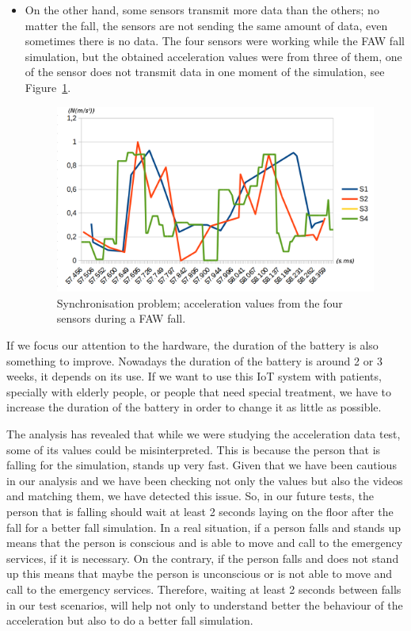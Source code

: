 \documentclass[review]{elsarticle}
\begin{document}
\begin{itemize}
 \item On the other hand, some sensors transmit more data than the others; no matter the fall, the sensors are not 
 sending the same amount of data, even sometimes there is no data. The four sensors were working while the FAW fall
 simulation, but the obtained acceleration values were from three of them, one of the sensor does not transmit data 
 in one moment of the simulation, see Figure~\ref{fig:synchronisation2}.
 
 \begin{figure}[!ht]
  \centering
  \includegraphics[scale=0.22]{img/synchronisation2.png}
  \caption[Comparison acceleration during two FAW falls]{Synchronisation problem; acceleration values from the four sensors during a FAW fall.}
  \label{fig:synchronisation2}
 \end{figure}
\end{itemize}

If we focus our attention to the hardware, the duration of the battery is also something to improve. Nowadays the 
duration of the battery is around 2 or 3 weeks, it depends on its use. If we want to use this IoT system with patients, 
specially with elderly people, or people that need special treatment, we have to increase the duration of the battery 
in order to change it as little as possible.

The analysis has revealed that while we were studying the acceleration data test, some of its values could be misinterpreted.
This is because the person that is falling for the simulation, stands up very fast. Given that we have been cautious
in our analysis and we have been checking not only the values but also the videos and matching them, we have detected
this issue. So, in our future tests, the person that is falling should wait at least 2 seconds laying on the floor 
after the fall for a better fall simulation. In a real situation, if a person falls and stands up means that the person
is conscious and is able to move and call to the emergency services, if it is necessary. On the contrary, if the person
falls and does not stand up this means that maybe the person is unconscious or is not able to move and call to the emergency
services. Therefore, waiting at least 2 seconds between falls in our test scenarios, will help not only to understand 
better the behaviour of the acceleration but also to do a better fall simulation.
\end{document}
